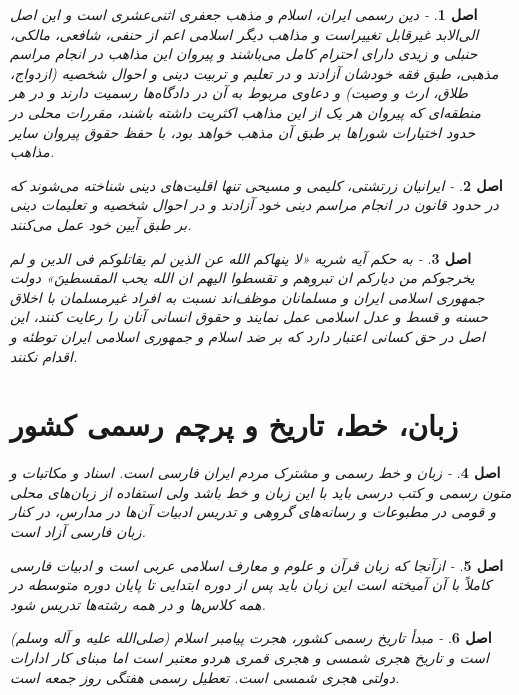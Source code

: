 \documentclass[12pt]{article}
\newtheorem{asl}{اصل}
\begin{document}
\begin{asl}- 
دین رسمی ایران‌، اسلام و مذهب جعفری اثنی‌عشری است و این اصل الی‌الابد غیرقابل تغییراست و مذاهب دیگر اسلامی اعم از حنفی‌، شافعی‌، مالکی‌، حنبلی و زیدی دارای احترام کامل می‌باشند و پیروان این مذاهب در انجام مراسم مذهبی‌، طبق فقه خودشان آزادند و در تعلیم و تربیت دینی و احوال شخصیه (ازدواج‌، طلاق، ارث و وصیت‌) و دعاوی مربوط به آن در دادگاه‌ها رسمیت دارند و در هر منطقه‌ای که پیروان هر یک از این مذاهب اکثریت داشته باشند، مقررات محلی در حدود اختیارات شوراها بر طبق آن مذهب خواهد بود، با حفظ حقوق پیروان سایر مذاهب‌.
\end{asl}

\begin{asl}- 
ایرانیان زرتشتی‌، کلیمی و مسیحی تنها اقلیت‌های دینی شناخته می‌شوند که در حدود قانون در انجام مراسم دینی خود آزادند و در احوال شخصیه و تعلیمات دینی بر طبق آیین خود عمل می‌کنند.
\end{asl}

\begin{asl}- 
به حکم آیه شریه «لا ینهاکم الله عن الذین لم یقاتلوکم فی الدین و لم یخرجوکم من دیارکم ان تبروهم و تقسطوا الیهم ان الله یحب المقسطینَ» دولت جمهوری اسلامی ایران و مسلمانان موظف‌اند نسبت به افراد غیرمسلمان با اخلاق حسنه و قسط و عدل اسلامی عمل نمایند و حقوق انسانی آنان را رعایت کنند، این اصل در حق کسانی اعتبار دارد که بر ضد اسلام و جمهوری اسلامی ایران توطئه و اقدام نکنند.
\end{asl}

\section{زبان، خط، تاریخ و پرچم رسمی کشور}

\begin{asl}- 
زبان و خط رسمی و مشترک مردم ایران فارسی است‌. اسناد و مکاتبات و متون رسمی و کتب درسی باید با این زبان و خط باشد ولی استفاده از زبان‌های محلی و قومی در مطبوعات و رسانه‌های گروهی و تدریس ادبیات آن‌ها در مدارس‌، در کنار زبان فارسی آزاد است‌.
\end{asl}

\begin{asl}- 
ازآنجا که زبان قرآن و علوم و معارف اسلامی عربی است و ادبیات فارسی کاملاً با آن آمیخته است این زبان باید پس از دوره ابتدایی تا پایان دوره متوسطه در همه کلاس‌ها و در همه رشته‌ها تدریس شود.
\end{asl}

\begin{asl}- 
مبدأ تاریخ رسمی کشور، هجرت پیامبر اسلام (صلی‌الله علیه و آله وسلم‌) است و تاریخ هجری شمسی و هجری قمری هردو معتبر است اما مبنای کار ادارات دولتی هجری شمسی است‌. تعطیل رسمی هفتگی روز جمعه است‌.
\end{asl}
\end{document}
